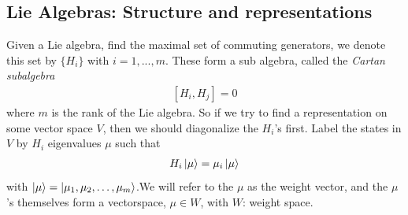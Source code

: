\documentclass[a4paper,12pt]{article}
\begin{document}
\subsection{Lie Algebras: Structure and representations}
Given a Lie algebra, find the maximal set of commuting generators, we denote this set by $\{H_i\}$ with $i=1,...,m$. These form a sub algebra, called the \textit{Cartan subalgebra}
\begin{equation}
	\begin{aligned}
		\left[H_i,H_j\right]=0
	\end{aligned}
\end{equation}
where $m$ is the rank of the Lie algebra. So if we try to find a representation on some vector space $V$, then we should diagonalize the $H_i$'s first. Label the states in $V$ by $H_i$ eigenvalues $\mu$ such that
\begin{equation}
	\begin{aligned}
		H_i\ket{\mu}=\mu_i\ket{\mu}
	\end{aligned}
\end{equation}
with $\ket{\mu}=\ket{\mu_1,\mu_2,\dots,\mu_m}$.We will refer to the $\mu$ as the weight vector, and the $\mu$'s themselves form a vectorspace, $\mu\in W$, with $W$: weight space.
\end{document}
